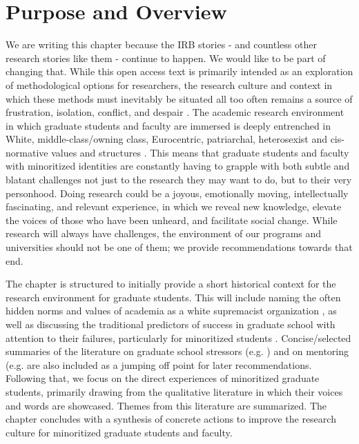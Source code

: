 \documentclass[
  11pt,
]{book}
\begin{document}
\section{Purpose and Overview}\label{purpose-and-overview}

We are writing this chapter because the IRB stories - and countless other research stories like them - continue to happen. We would like to be part of changing that. While this open access text is primarily intended as an exploration of methodological options for researchers, the research culture and context in which these methods must inevitably be situated all too often remains a source of frustration, isolation, conflict, and despair \citep{hall_falling_2022, maton_experiences_2011, miller_values_2020}. The academic research environment in which graduate students and faculty are immersed is deeply entrenched in White, middle-class/owning class, Eurocentric, patriarchal, heterosexist and cis-normative values and structures \citep{ajjawi_what_2018, buchanan_upending_2021, okun_white_2021, perez-lopez_ten_2022, posselt_rigor_2018, talusan_identity-conscious_2022, tung_making_2023, watkins_engaging_2018}. This means that graduate students and faculty with minoritized identities are constantly having to grapple with both subtle and blatant challenges not just to the research they may want to do, but to their very personhood. Doing research could be a joyous, emotionally moving, intellectually fascinating, and relevant experience, in which we reveal new knowledge, elevate the voices of those who have been unheard, and facilitate social change. While research will always have challenges, the environment of our programs and universities should not be one of them; we provide recommendations towards that end.

The chapter is structured to initially provide a short historical context for the research environment for graduate students. This will include naming the often hidden norms and values of academia as a white supremacist organization \citep{dancy_historically_2018, okun_white_2021, perez-lopez_ten_2022}, as well as discussing the traditional predictors of success in graduate school with attention to their failures, particularly for minoritized students \citep{ajjawi_what_2018, feldon_predictive_2024, gittings_doctoral_2018, kis_leaving_2022, kurysheva_once_2022}. Concise/selected summaries of the literature on graduate school stressors (e.g. \citet{cho_under_2021} ) and on mentoring (e.g. \citep{hall_falling_2022, kim_putting_2021, mangione_mentoring_2018, cirillo-mccarthy_developing_2022} are also included as a jumping off point for later recommendations. Following that, we focus on the direct experiences of minoritized graduate students, primarily drawing from the qualitative literature in which their voices and words are showcased. Themes from this literature are summarized. The chapter concludes with a synthesis of concrete actions to improve the research culture for minoritized graduate students and faculty.
\end{document}
